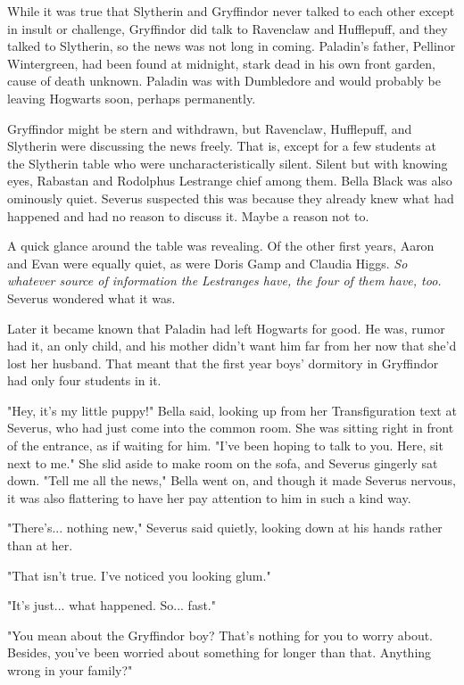 \documentclass[a4paper,11pt]{article}
\begin{document}
While it was true that Slytherin and Gryffindor never talked to each other except in insult or challenge, Gryffindor did talk to Ravenclaw and Hufflepuff, and they talked to Slytherin, so the news was not long in coming. Paladin's father, Pellinor Wintergreen, had been found at midnight, stark dead in his own front garden, cause of death unknown. Paladin was with Dumbledore and would probably be leaving Hogwarts soon, perhaps permanently.

Gryffindor might be stern and withdrawn, but Ravenclaw, Hufflepuff, and Slytherin were discussing the news freely. That is, except for a few students at the Slytherin table who were uncharacteristically silent. Silent but with knowing eyes, Rabastan and Rodolphus Lestrange chief among them. Bella Black was also ominously quiet. Severus suspected this was because they already knew what had happened and had no reason to discuss it. Maybe a reason not to.

A quick glance around the table was revealing. Of the other first years, Aaron and Evan were equally quiet, as were Doris Gamp and Claudia Higgs. \emph{So whatever source of information the Lestranges have, the four of them have, too.} Severus wondered what it was.

Later it became known that Paladin had left Hogwarts for good. He was, rumor had it, an only child, and his mother didn't want him far from her now that she'd lost her husband. That meant that the first year boys' dormitory in Gryffindor had only four students in it.

"Hey, it's my little puppy!" Bella said, looking up from her Transfiguration text at Severus, who had just come into the common room. She was sitting right in front of the entrance, as if waiting for him. "I've been hoping to talk to you. Here, sit next to me." She slid aside to make room on the sofa, and Severus gingerly sat down. "Tell me all the news," Bella went on, and though it made Severus nervous, it was also flattering to have her pay attention to him in such a kind way.

"There's... nothing new," Severus said quietly, looking down at his hands rather than at her.

"That isn't true. I've noticed you looking glum."

"It's just... what happened. So... fast."

"You mean about the Gryffindor boy? That's nothing for you to worry about. Besides, you've been worried about something for longer than that. Anything wrong in your family?"
\end{document}

